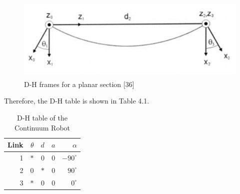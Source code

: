\documentclass[12pt,twoside,a4]{mwbk}
\begin{document}
\begin{figure}[h]
    \centering
    \includegraphics[width=12.0cm, height=4.0cm]{D-H.png}
    \caption{D-H frames for a planar section [36]}
\end{figure}
\newpage
Therefore, the D-H table is shown in Table 4.1.
\begin{table}[h!]
\centering
\begin{tabular}{rrrrr} 
\textbf{Link} & $\theta$ & $d$ & $a$ & $\alpha$ \\ [0.5ex] 
    \hline
    1 & $*$ & 0 & 0 & $-90^{\circ}$ \\
    2 & 0 & $*$ & 0 & $90^{\circ}$ \\
    3 & $*$ & 0 & 0 & $0^{\circ}$
\end{tabular}
\caption{D-H table of the Continuum Robot}
\end{table}
\end{document}
